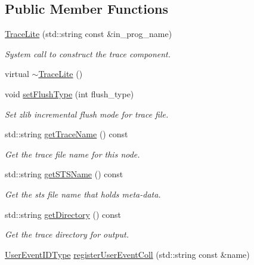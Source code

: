 \subsection*{Public Member Functions}
\begin{DoxyCompactItemize}
\item 
\hyperlink{structvt_1_1trace_1_1_trace_lite_a328b735cfc479d3bf3339638aeb96a10}{Trace\+Lite} (std\+::string const \&in\+\_\+prog\+\_\+name)
\begin{DoxyCompactList}\small\item\em System call to construct the trace component. \end{DoxyCompactList}\item 
virtual \hyperlink{structvt_1_1trace_1_1_trace_lite_a08eca22659dc1f361d534c2b9c03b90b}{$\sim$\+Trace\+Lite} ()
\item 
void \hyperlink{structvt_1_1trace_1_1_trace_lite_a8f9ba027397787cf6b580e397d8da484}{set\+Flush\+Type} (int flush\+\_\+type)
\begin{DoxyCompactList}\small\item\em Set zlib incremental flush mode for trace file. \end{DoxyCompactList}\item 
std\+::string \hyperlink{structvt_1_1trace_1_1_trace_lite_aa0cff75782c7c6fb3f90731b98b49c2f}{get\+Trace\+Name} () const
\begin{DoxyCompactList}\small\item\em Get the trace file name for this node. \end{DoxyCompactList}\item 
std\+::string \hyperlink{structvt_1_1trace_1_1_trace_lite_af62ce95a0cd54b4d729e730e9dd94311}{get\+S\+T\+S\+Name} () const
\begin{DoxyCompactList}\small\item\em Get the sts file name that holds meta-\/data. \end{DoxyCompactList}\item 
std\+::string \hyperlink{structvt_1_1trace_1_1_trace_lite_aee5f10410a94c3149eefe595ccb2bbab}{get\+Directory} () const
\begin{DoxyCompactList}\small\item\em Get the trace directory for output. \end{DoxyCompactList}\item 
\hyperlink{namespacevt_1_1trace_a5908920d051c144c89f17c69ed262350}{User\+Event\+I\+D\+Type} \hyperlink{structvt_1_1trace_1_1_trace_lite_a095a8bb2aaebbaf340b52c421101f918}{register\+User\+Event\+Coll} (std\+::string const \&name)

\end{DoxyCompactItemize}

